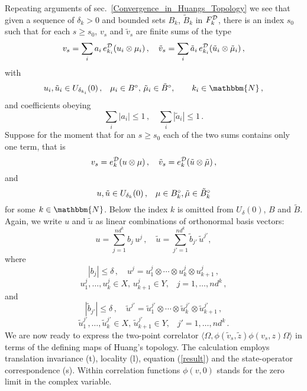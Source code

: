 \documentclass[a4paper,12pt,twoside]{article}
\renewcommand{\b}{\langle}
\renewcommand{\k}{\rangle}
\renewcommand{\c}[1]{{\cal #1}}
\newcommand{\bN}{\mathbbm{N}}
\newcommand{\eq}[1]{(\ref{#1})}
\newcommand{\D}{\c{D}}
\newcommand{\Fd}{F^{\D}_k}
\newcommand{\ed}{e_k^{\D}}
\newcommand{\edi}{e_{k_i}^{\D}}
\newcommand{\Bp}{B^{\circ}}
\newcommand{\vt}{\tilde{v}}
\newcommand{\zt}{\tilde{z}}
\newcommand{\Bt}{\tilde{B}}
\newcommand{\at}{\tilde{a}}
\newcommand{\bt}{\tilde{b}}
\newcommand{\ut}{\tilde{u}}
\newcommand{\mut}{\tilde{\mu}}
\newcommand{\Btp}{\tilde{B}^{\circ}}
\begin{document}
Repeating arguments of sec.\ \ref{Convergence_in_Huangs_Topology}
we see that given a sequence of $\delta_k > 0$ and bounded sets
$B_k$, $\Bt_k$ in $\Fd$, there is an index $s_0$
such that for each $s\ge s_0$, $v_s$ and $\vt_s$ are finite sums of the type
\begin{equation}
\label{convex_hull}
v_s = \sum_i a_i\,\edi(u_i\otimes\mu_i)\,,\quad
\vt_s = \sum_i \at_i\,\edi(\ut_i\otimes\mut_i)\,,
\end{equation}
with
$$\mbox{$u_i, \ut_i\in U_{\delta_{k_i}}(0)\,$,\quad $\mu_i\in\Bp$, $\mut_i\in\Btp$},\qquad k_i\in\bN\,,$$
and coefficients obeying
$$\sum_i |a_i| \le 1\,,\quad\sum_i |\at_i| \le 1\,.$$
Suppose for the moment that for an $s\ge s_0$ each of the two sums contains
only one term, that is
$$v_s = \ed(u\otimes\mu)\,,\quad\vt_s = \ed(\ut\otimes\mut)\,,$$
and
$$\mbox{$u, \ut\in U_{\delta_k}(0)\,,$\quad $\mu\in\Bp_k, \mut\in\Btp_k$}$$
for some $k\in\bN$. Below the index $k$ is omitted from $U_{\delta}(0)$,
$B$ and $\Bt$.
Again, we write $u$ and $\ut$ as linear combinations
of orthonormal basis vectors:
$$u = \sum_{j=1}^{nd^k} b_j\,u^j\,,\quad \ut = \sum_{j'=1}^{nd^k} \bt_{j'}\,\ut^{j'}, $$
where
$$|b_j|\le\delta\,,\quad u^j = u^j_1\otimes\cdots\otimes u^j_k\otimes u^j_{k+1}\,,$$
$$\mbox{$u^j_1,\ldots,u^j_k\in X$, $u^j_{k+1}\in Y$,}\quad j = 1,\ldots, nd^k\,,$$
and
$$|\bt_{j'}|\le\delta\,,\quad \ut^{j'} = \ut^{j'}_1\otimes\cdots\otimes \ut^{j'}_k\otimes \ut^{j'}_{k+1}\,,$$
$$\mbox{$\ut^{j'}_1,\ldots,\ut^{j'}_k\in X$, $\ut^{j'}_{k+1}\in Y$,}\quad j' = 1,\ldots, nd^k\,.$$
We are now ready to express the two-point correlator
$\b\Omega,\phi(\vt_s,\zt)\phi(v_s,z)\Omega\k$
in terms of the defining maps of Huang's topology.
The calculation employs translation invariance (t),
locality (l), equation \eq{result} and the state-operator
correspondence (s). Within correlation functions
$\phi(v,0)$ stands for the zero limit in the complex
variable.
\end{document}
